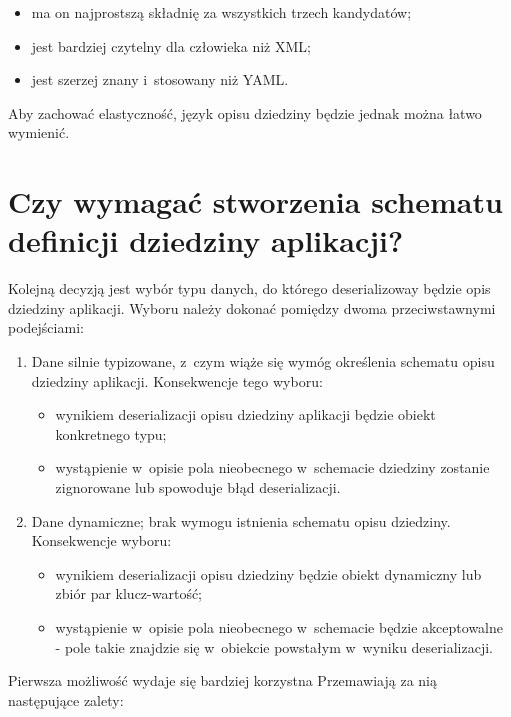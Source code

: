 \begin{itemize}
 \item ma on najprostszą składnię za wszystkich trzech kandydatów;
 \item jest bardziej czytelny dla człowieka niż XML;
 \item jest szerzej znany i~stosowany niż YAML.
\end{itemize}

Aby zachować elastyczność, język opisu dziedziny będzie jednak można łatwo wymienić.



\section{Czy wymagać stworzenia schematu definicji dziedziny aplikacji?} \label{sec:core:domain_schema_requirement}

Kolejną decyzją jest wybór typu danych, do którego deserializoway będzie opis dziedziny aplikacji.
Wyboru należy dokonać pomiędzy dwoma przeciwstawnymi podejściami:

\begin{enumerate}
 \item Dane silnie typizowane, z~czym wiąże się wymóg określenia schematu opisu dziedziny aplikacji.
  Konsekwencje tego wyboru:
  \begin{itemize}
   \item wynikiem deserializacji opisu dziedziny aplikacji będzie obiekt konkretnego typu;
   \item wystąpienie w~opisie pola nieobecnego w~schemacie dziedziny zostanie zignorowane lub spowoduje błąd deserializacji.
  \end{itemize}
 \item Dane dynamiczne; brak wymogu istnienia schematu opisu dziedziny.
  Konsekwencje wyboru:
  \begin{itemize}
   \item wynikiem deserializacji opisu dziedziny będzie obiekt dynamiczny lub zbiór par klucz-wartość;
   \item wystąpienie w~opisie pola nieobecnego w~schemacie będzie akceptowalne - pole takie znajdzie się w~obiekcie powstałym w~wyniku deserializacji.
  \end{itemize}

\end{enumerate}

Pierwsza możliwość wydaje się bardziej korzystna
Przemawiają za nią następujące zalety:


